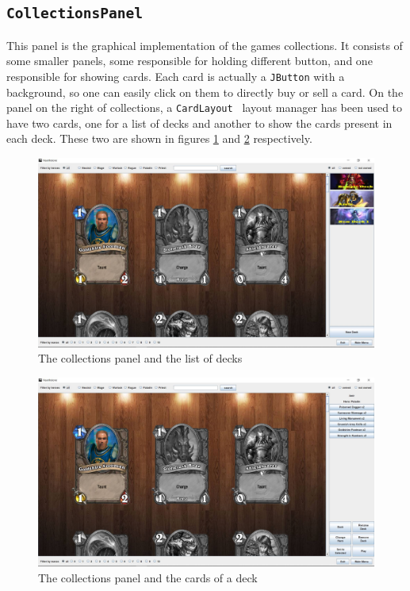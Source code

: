 \documentclass[a4paper]{article}
\begin{document}
\subsection{\texttt{CollectionsPanel}}
This panel is the graphical implementation of the games collections. It consists of some smaller panels, some responsible for holding different button, and one responsible for showing cards. Each card is actually a \texttt{JButton} with a background, so one can easily click on them to directly buy or sell a card. On the panel on the right of collections, a \texttt{CardLayout } layout manager has been used to have two cards, one for a list of decks and another to show the cards present in each deck. These two are shown in figures  \ref{cl1} and \ref{cl2} respectively.

\begin{figure}[h!]
	\centering
	\includegraphics[scale=0.4]{collectionPanel1.JPG}
	\caption{The collections panel and the list of decks}
	\label{cl1}
\end{figure}

\begin{figure}[h!]
	\centering
	\includegraphics[scale=0.4]{collectionPanel2.JPG}
	\caption{The collections panel and the cards of a deck}
	\label{cl2}
\end{figure}
\end{document}
